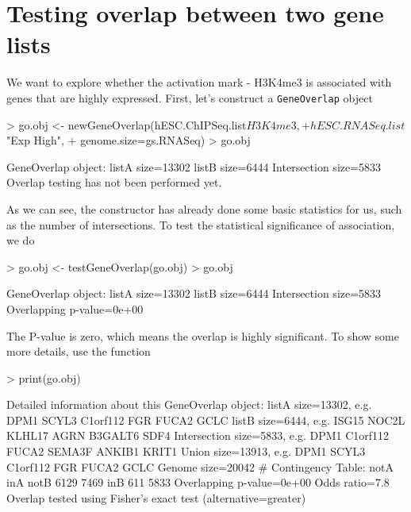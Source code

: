 \documentclass{article}
\begin{document}
\section{Testing overlap between two gene lists} \label{sec:test}
We want to explore whether the activation mark - H3K4me3 is associated with genes that are highly expressed. First, let's construct a {\tt GeneOverlap} object
\begin{Schunk}
\begin{Sinput}
> go.obj <- newGeneOverlap(hESC.ChIPSeq.list$H3K4me3, 
+                          hESC.RNASeq.list$"Exp High", 
+                          genome.size=gs.RNASeq)
> go.obj
\end{Sinput}
\begin{Soutput}
GeneOverlap object:
listA size=13302
listB size=6444
Intersection size=5833
Overlap testing has not been performed yet.
\end{Soutput}
\end{Schunk}
As we can see, the  constructor has already done some basic statistics for us, such as the number of intersections. To test the statistical significance of association, we do
\begin{Schunk}
\begin{Sinput}
> go.obj <- testGeneOverlap(go.obj)
> go.obj
\end{Sinput}
\begin{Soutput}
GeneOverlap object:
listA size=13302
listB size=6444
Intersection size=5833
Overlapping p-value=0e+00
\end{Soutput}
\end{Schunk}
The P-value is zero, which means the overlap is highly significant. To show some more details, use the  function
\begin{Schunk}
\begin{Sinput}
> print(go.obj)
\end{Sinput}
\begin{Soutput}
Detailed information about this GeneOverlap object:
listA size=13302, e.g. DPM1 SCYL3 C1orf112 FGR FUCA2 GCLC
listB size=6444, e.g. ISG15 NOC2L KLHL17 AGRN B3GALT6 SDF4
Intersection size=5833, e.g. DPM1 C1orf112 FUCA2 SEMA3F ANKIB1 KRIT1
Union size=13913, e.g. DPM1 SCYL3 C1orf112 FGR FUCA2 GCLC
Genome size=20042
# Contingency Table:
     notA  inA
notB 6129 7469
inB   611 5833
Overlapping p-value=0e+00
Odds ratio=7.8
Overlap tested using Fisher's exact test (alternative=greater)
\end{Soutput}
\end{Schunk}
\end{document}
